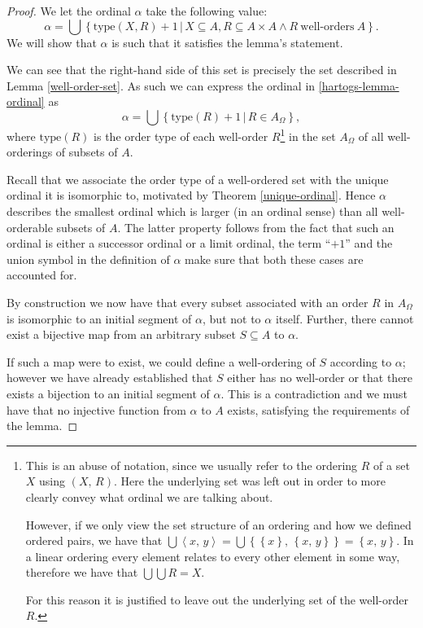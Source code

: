 \documentclass[../../main.tex]{subfiles}
\begin{document}
\begin{proof}
    We let the ordinal $\alpha$ take the following value:
    \begin{equation}\label{hartogs-lemma-ordinal}
        \alpha = \bigcup \left\{\text{type}\left(X, R\right) + 1 \,\vert\, X \subseteq A, R \subseteq A \times A \wedge R\ \text{well-orders}\ A\right\}.
    \end{equation}
    We will show that $\alpha$ is such that it satisfies the lemma's statement.

    We can see that the right-hand side of this set is precisely the set described in Lemma \ref{well-order-set}.
    As such we can express the ordinal in \eqref{hartogs-lemma-ordinal} as
    $$\alpha = \bigcup \left\{\text{type}\left(R\right) + 1 \,\vert\, R \in A{_\Omega}\right\},$$
    where $\text{type}\left(R\right)$ is the order type of each well-order $R$\footnote{
        This is an abuse of notation, since we usually refer to the ordering $R$ of a set $X$ using $\left(X,\, R\right)$.
        Here the underlying set was left out in order to more clearly convey what ordinal we are talking about.

        However, if we only view the set structure of an ordering and how we defined ordered pairs,
        we have that $\bigcup \left<x,\, y\right> = \bigcup \left\{\left\{x\right\},\, \left\{x,\, y\right\}\right\} = \left\{x,\, y\right\}$.
        In a linear ordering every element relates to every other element in some way, therefore we have that $\bigcup \bigcup R = X$.

        For this reason it is justified to leave out the underlying set of the well-order $R$.
    }
    in the set $A_\Omega$ of all well-orderings of subsets of $A$.

    Recall that we associate the order type of a well-ordered set with the unique ordinal it is isomorphic to, motivated by Theorem \ref{unique-ordinal}.
    Hence $\alpha$ describes the smallest ordinal which is larger (in an ordinal sense) than all well-orderable subsets of $A$.
    The latter property follows from the fact that such an ordinal is either a successor ordinal or a limit ordinal, 
    the term ``$+1$'' and the union symbol in the definition of $\alpha$ make sure that both these cases are accounted for.

    By construction we now have that every subset associated with an order $R$ in $A_\Omega$ is isomorphic to an initial segment of $\alpha$, but not to $\alpha$ itself.
    Further, there cannot exist a bijective map from an arbitrary subset $S \subseteq A$ to $\alpha$.
    
    If such a map were to exist, we could define a well-ordering of $S$ according to $\alpha$;
    however we have already established that $S$ either has no well-order or that there exists a bijection to an initial segment of $\alpha$.
    This is a contradiction and we must have that no injective function from $\alpha$ to $A$ exists, satisfying the requirements of the lemma.
\end{proof}
\end{document}
